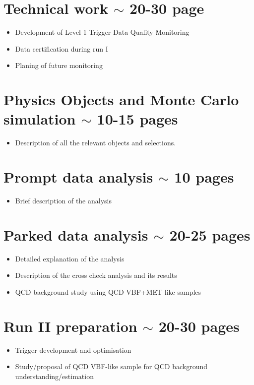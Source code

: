\documentclass[a4paper,10pt]{article}
\begin{document}
\section{Technical work $\sim$ 20-30 page}

\begin{itemize}
  \item Development of Level-1 Trigger Data Quality Monitoring 
  \item Data certification during run I
  \item Planing of future monitoring 
\end{itemize}

\section{Physics Objects and Monte Carlo simulation $\sim$ 10-15 pages}

\begin{itemize}
  \item Description of all the relevant objects and selections.
\end{itemize}

\section{Prompt data analysis $\sim$ 10 pages}

\begin{itemize}
  \item Brief description of the analysis 
\end{itemize}

\section{Parked data analysis $\sim$ 20-25 pages}

\begin{itemize}
  \item Detailed explanation of the analysis
  \item Description of the cross check analysis and its results
  \item QCD background study using QCD VBF+MET like samples 
\end{itemize}

\section{Run II preparation $\sim$ 20-30 pages}

\begin{itemize}
  \item Trigger development and optimisation
  \item Study/proposal of QCD VBF-like sample for QCD background understanding/estimation
\end{itemize}
\end{document}
